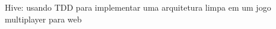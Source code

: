 \documentclass[a4paper,12pt]{article}
\begin{document}
Hive: usando TDD para implementar uma arquitetura limpa em um jogo multiplayer para web
\end{document}

